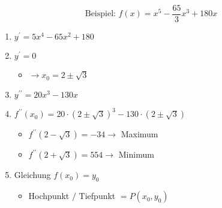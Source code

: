 \begin{example}
    $$
    \text{Beispiel: }f(x)=x^{5}-\frac{65}{3} x^{3}+180 x
    $$
    
    \begin{enumerate}
        \item $y^{\prime}=5 x^{4}-65 x^{2}+180$
    
        \item $y^{\prime}=0$
            \begin{itemize}
                \item $\rightarrow x_{0}=2 \pm \sqrt{3}$
            \end{itemize}
        \item $y^{\prime \prime}=20 x^{3}-130 x$
    
        \item $f^{\prime \prime}\left(x_{0}\right)=20 \cdot(2 \pm \sqrt{3})^{3}-130 \cdot(2 \pm \sqrt{3})$
            \begin{itemize}
              \item $f^{\prime \prime}(2-\sqrt{3})=-34 \rightarrow$ Maximum
              \item $f^{\prime \prime}(2+\sqrt{3})=554 \rightarrow$ Minimum
            \end{itemize}
        \item Gleichung $f\left(x_{0}\right)=y_{0}$
            \begin{itemize}
                \item Hochpunkt $/$ Tiefpunkt $=P\left(x_{0}, y_{0}\right)$
            \end{itemize}
    \end{enumerate}
\end{example}





